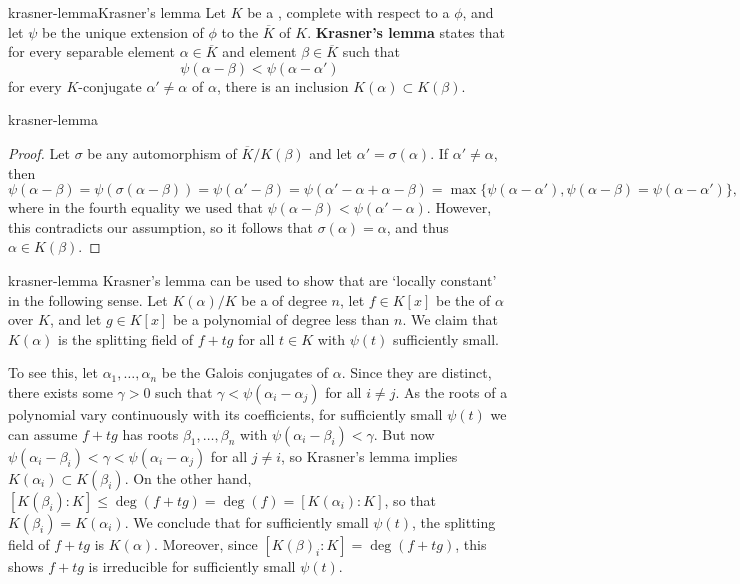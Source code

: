 \begin{topic}{krasner-lemma}{Krasner's lemma}
    Let $K$ be a , complete with respect to a  $\phi$, and let $\psi$ be the unique extension of $\phi$ to the  $\overline{K}$ of $K$.
    \textbf{Krasner's lemma} states that for every separable element $\alpha \in \overline{K}$ and element $\beta \in \overline{K}$ such that
    \[ \psi(\alpha - \beta) < \psi(\alpha - \alpha') \]
    for every $K$-conjugate $\alpha' \ne \alpha$ of $\alpha$, there is an inclusion $K(\alpha) \subset K(\beta)$.
\end{topic}

\begin{example}{krasner-lemma}
    \begin{proof}
        Let $\sigma$ be any automorphism of $\overline{K} / K(\beta)$ and let $\alpha' = \sigma(\alpha)$. If $\alpha' \ne \alpha$, then
        \[ \psi(\alpha - \beta) = \psi(\sigma(\alpha - \beta)) = \psi(\alpha' - \beta) = \psi(\alpha' - \alpha + \alpha - \beta) = \max \{ \psi(\alpha - \alpha'), \psi(\alpha - \beta) = \psi(\alpha - \alpha') \} , \]
        where in the fourth equality we used that $\psi(\alpha - \beta) < \psi(\alpha' - \alpha)$. However, this contradicts our assumption, so it follows that $\sigma(\alpha) = \alpha$, and thus $\alpha \in K(\beta)$.
    \end{proof}
\end{example}

\begin{example}{krasner-lemma}
    Krasner's lemma can be used to show that  are `locally constant' in the following sense. Let $K(\alpha) / K$ be a  of degree $n$, let $f \in K[x]$ be the  of $\alpha$ over $K$, and let $g \in K[x]$ be a polynomial of degree less than $n$. We claim that $K(\alpha)$ is the splitting field of $f + tg$ for all $t \in K$ with $\psi(t)$ sufficiently small.
    
    To see this, let $\alpha_1, \ldots, \alpha_n$ be the Galois conjugates of $\alpha$. Since they are distinct, there exists some $\gamma > 0$ such that $\gamma < \psi(\alpha_i - \alpha_j)$ for all $i \ne j$. As the roots of a polynomial vary continuously with its coefficients, for sufficiently small $\psi(t)$ we can assume $f + tg$ has roots $\beta_1, \ldots, \beta_n$ with $\psi(\alpha_i - \beta_i) < \gamma$. But now $\psi(\alpha_i - \beta_i) < \gamma < \psi(\alpha_i - \alpha_j)$ for all $j \ne i$, so Krasner's lemma implies $K(\alpha_i) \subset K(\beta_i)$. On the other hand, $[K(\beta_i) : K] \le \deg(f + tg) = \deg(f) = [K(\alpha_i) : K]$, so that $K(\beta_i) = K(\alpha_i)$. We conclude that for sufficiently small $\psi(t)$, the splitting field of $f + tg$ is $K(\alpha)$. Moreover, since $[K(\beta)_i : K] = \deg(f + tg)$, this shows $f + tg$ is irreducible for sufficiently small $\psi(t)$.
\end{example}

